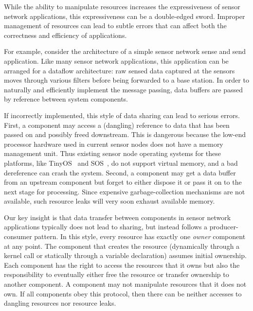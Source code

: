 While the ability to manipulate resources increases the expressiveness
of sensor network applications, this expressiveness can be a
double-edged sword.  Improper management of resources can lead to
subtle errors that can affect both the correctness and efficiency of
applications.

For example, consider the architecture of a simple sensor network
sense and send application.
Like many sensor network applications, this application can be
arranged for a dataflow architecture:  raw sensed data captured at the
sensors moves through various filters
before being forwarded to a base station.
In order to naturally and efficiently implement the message passing,
data buffers are 
passed by
reference between system components.

If incorrectly implemented, this style of data sharing can lead to
serious errors.  First, a component may access a (dangling) reference to
data that has been passed on and possibly freed downstream. 
%
This is dangerous because
%
the low-end processor hardware used in current sensor nodes does not
have a memory management unit.  Thus existing sensor node operating
systems for these platforms, like TinyOS~\cite{TinyOS} and
SOS~\cite{sos}, do not support virtual memory, and a bad dereference
can crash the system. 
%
Second, a component may get a data buffer from an upstream component but
forget to either dispose it or pass it on to the next stage for
processing.  Since expensive garbage-collection mechanisms are not
available, such resource leaks will very soon exhaust available
memory.


Our key insight is that data transfer between
components in sensor network applications 
typically does not lead to sharing, but instead follows a
producer-consumer pattern.  
In this style,
every resource has exactly one {\em owner} component at any point.  The
component that creates the resource (dynamically 
through a kernel call or statically
through a variable declaration) assumes initial ownership.
Each component has the right to access the resources that it owns but
also the responsibility to eventually either free the resource or transfer
ownership to another component.  
%
A component may not manipulate resources that it does not own.  If all
components obey this protocol, then there can be neither accesses to
dangling resources nor resource leaks.



